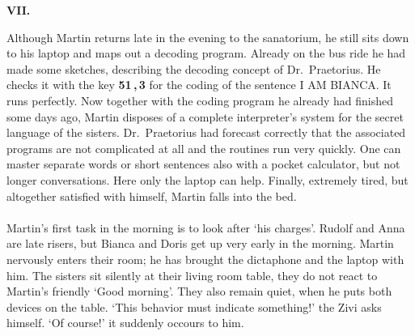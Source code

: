 
\begin{center} 
{\bf VII.} 
\end{center} 
Although Martin returns late in the evening to the sanatorium, he still sits down to his laptop and 
maps out a decoding program. 
Already on the bus ride he had made some sketches, describing the decoding concept of Dr.~Praetorius. 
He checks it with the key {\bf 51\,,\,3} for the coding of the sentence I AM BIANCA. 
It runs perfectly. 
Now together with the coding program he already had finished some days ago, Martin disposes of a complete 
interpreter's system for the secret language of the sisters. 
Dr.~Praetorius had forecast correctly that the associated programs are not complicated at all and the 
routines run very quickly. 
One can master separate words or short sentences also with a pocket calculator, but not longer conversations.
Here only the laptop can help. 
Finally, extremely tired, but altogether satisfied with himself, Martin falls into the bed. \\ \\ 
Martin's first task in the morning is to look after `his charges'. 
Rudolf and Anna are late risers, but Bianca and Doris get up very early in the morning. 
Martin nervously enters their room; he has brought the dictaphone and the laptop with him. 
The sisters sit silently at their living room table, they do not react to Martin's friendly `Good morning'. 
They also remain quiet, when he puts both devices on the table.
`This behavior must indicate something!' the Zivi asks himself. `Of course!' it suddenly occours to him. 

